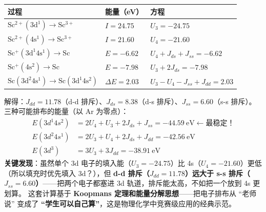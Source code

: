 \documentclass[a4paper,11pt]{ctexart}
\newcounter{none}
\begin{document}
{\def\LTcaptype{none} %
\begin{longtable}[]{@{}
  >{\raggedright\arraybackslash}p{}
  >{\centering\arraybackslash}p{}
  >{\raggedright\arraybackslash}p{}@{}}
\toprule\noalign{}
\begin{minipage}[b]{\linewidth}\raggedright
过程
\end{minipage} & \begin{minipage}[b]{\linewidth}\centering
能量（eV）
\end{minipage} & \begin{minipage}[b]{\linewidth}\raggedright
方程
\end{minipage} \\
\midrule\noalign{}
\endhead
\bottomrule\noalign{}
\endlastfoot
\(\mathrm{Sc^{2+}(3d^1) \rightarrow Sc^{3+}}\) & \(I = 24.75\) & \(U_3 = -24.75\) \\
\(\mathrm{Sc^{2+}(4s^1) \rightarrow Sc^{3+}}\) & \(I = 21.60\) & \(U_4 = -21.60\) \\
\(\mathrm{Sc^{+}(3d^1 4s^1) \rightarrow Sc}\) & \(E = -6.62\) & \(U_4 + J_{ds} + J_{ss} = -6.62\) \\
\(\mathrm{Sc^{+}(4s^2) \rightarrow Sc}\) & \(E = -7.98\) & \(U_3 + 2J_{ds} = -7.98\) \\
\(\mathrm{Sc(3d^2 4s^1) \rightarrow Sc(3d^1 4s^2)}\) & \(\Delta E = 2.03\) & \(U_3 - U_4 - J_{ss} + J_{dd} = 2.03\) \\
\end{longtable}
}

解得：\(J_{dd} = 11.78\)（d-d 排斥）、\(J_{ds} = 8.38\)（d-s 排斥）、\(J_{ss} = 6.60\)（s-s 排斥）。
三种可能排布的能量（以 Ar 为零点）：
\[\begin{aligned}
E(3d^1 4s^2) &= 2U_4 + U_3 + 2J_{ds} + J_{ss} = -44.59\ \mathrm{eV} \leftarrow \text{最稳定！}\\
E(3d^2 4s^1) &= 2U_3 + U_4 + 2J_{ds} + J_{dd} = -42.56\ \mathrm{eV}\\
E(3d^3)      &= 3U_3 + 3J_{dd} = -38.91\ \mathrm{eV}
\end{aligned}\]
\textbf{关键发现}：虽然单个 3d 电子的填入能（\(U_3 = -24.75\)）比 4s（\(U_4 = -21.60\)）更低（所以填充时优先填入 3d？），但 \textbf{d-d 排斥（\(J_{dd} = 11.78\)）远大于 s-s 排斥（\(J_{ss} = 6.60\)）}------把两个电子都塞进 3d 轨道，排斥能太高，不如把一个放到 4s 更划算。
这套计算基于 \textbf{Koopmans 定理和能量分解思想}------把电子排布从 ``老师说'' 变成了 \textbf{``学生可以自己算''}，这是物理化学中竞赛级应用的经典示范。
\end{document}
